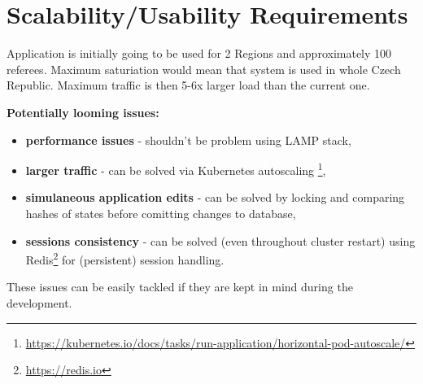 \section{Scalability/Usability Requirements}
Application is initially going to be used for 2 Regions and approximately 100 referees. Maximum saturiation would mean that system is used in whole Czech Republic. Maximum traffic is then 5-6x larger load than the current one.
\newline
\par
\textbf{Potentially looming issues:}
\begin{itemize}
  \item \textbf{performance issues} - shouldn't be problem using LAMP stack, 
  \item \textbf{larger traffic} - can be solved via Kubernetes autoscaling \footnote{\url{https://kubernetes.io/docs/tasks/run-application/horizontal-pod-autoscale/}},  
  \item \textbf{simulaneous application edits} - can be solved by locking and comparing hashes of states before comitting changes to database,
  \item \textbf{sessions consistency} - can be solved (even throughout cluster restart) using Redis\footnote{\url{https://redis.io}} for (persistent) session handling.
\end{itemize}
These issues can be easily tackled if they are kept in mind during the development.